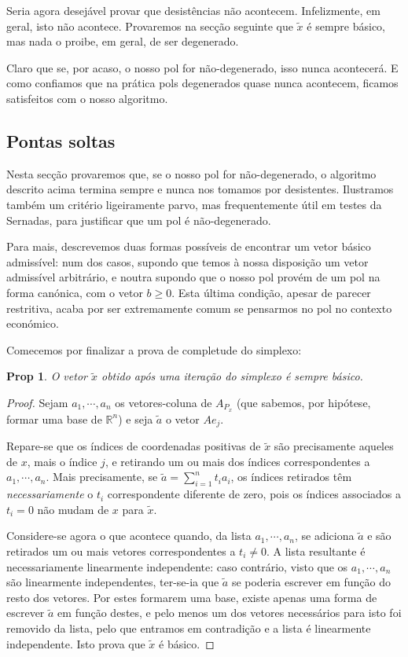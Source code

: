 \documentclass{article}
\newcommand{\R}{\mathbb{R}}
\newtheorem{prop}{Prop}
\theoremstyle{definition}
\begin{document}
	Seria agora desejável provar que desistências não acontecem. Infelizmente, em geral, isto não acontece. Provaremos na secção seguinte que $\tilde x$ é sempre básico, mas nada o proibe, em geral, de ser degenerado.
	
	Claro que se, por acaso, o nosso pol for não-degenerado, isso nunca acontecerá. E como confiamos que na prática pols degenerados quase nunca acontecem, ficamos satisfeitos com o nosso algoritmo.
	
	\subsection{Pontas soltas}
	
	Nesta secção provaremos que, se o nosso pol for não-degenerado, o algoritmo descrito acima termina sempre e nunca nos tomamos por desistentes. Ilustramos também um critério ligeiramente parvo, mas frequentemente útil em testes da Sernadas, para justificar que um pol é não-degenerado.
	
	Para mais, descrevemos duas formas possíveis de encontrar um vetor básico admissível: num dos casos, supondo que temos à nossa disposição um vetor admissível arbitrário, e noutra supondo que o nosso pol provém de um pol na forma canónica, com o vetor $b \geq 0$. Esta última condição, apesar de parecer restritiva, acaba por ser extremamente comum se pensarmos no pol no contexto económico.
	
	Comecemos por finalizar a prova de completude do simplexo:
	
	\begin{prop}
	O vetor $\tilde x$ obtido após uma iteração do simplexo é sempre básico.
	\end{prop}
	
	\begin{proof}
	Sejam $a_1, \cdots, a_n$ os vetores-coluna de $A_{P_x}$ (que sabemos, por hipótese, formar uma base de $\R^n$) e seja $\tilde a$ o vetor $A e_j$.
	
	Repare-se que os índices de coordenadas positivas de $\tilde x$ são precisamente aqueles de $x$, mais o índice $j$, e retirando um ou mais dos índices correspondentes a $a_1, \cdots, a_n$. Mais precisamente, se $\tilde a = \sum_{i=1}^n t_i a_i$, os índices retirados têm \emph{necessariamente} o $t_i$ correspondente diferente de zero, pois os índices associados a $t_i=0$ não mudam de $x$ para $\tilde x$.
	
	Considere-se agora o que acontece quando, da lista $a_1, \cdots, a_n$, se adiciona $\tilde a$ e são retirados um ou mais vetores correspondentes a $t_i \neq 0$. A lista resultante é necessariamente linearmente independente: caso contrário, visto que os $a_1, \cdots, a_n$ são linearmente independentes, ter-se-ia que $\tilde a$ se poderia escrever em função do resto dos vetores. Por estes formarem uma base, existe apenas uma forma de escrever $\tilde a$ em função destes, e pelo menos um dos vetores necessários para isto foi removido da lista, pelo que entramos em contradição e a lista é linearmente independente. Isto prova que $\tilde x$ é básico.
	\end{proof}
	
\end{document}
